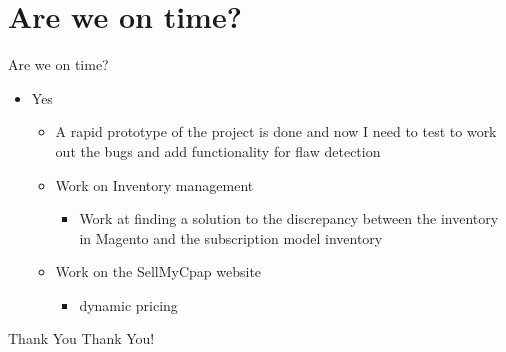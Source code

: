\documentclass[aspectratio=1610]{beamer}
\begin{document}
\section{Are we on time?}
\begin{frame}{Are we on time?}
    \begin{itemize}
        \item Yes
        \begin{itemize}
            \item A rapid prototype of the project is done and now I need to test to work out the bugs and add functionality for flaw detection
            \item Work on Inventory management 
            \begin{itemize}
                \item Work at finding a solution to the discrepancy between the inventory in Magento and the subscription model inventory
            \end{itemize}
            \item Work on the SellMyCpap website
            \begin{itemize}
                \item dynamic pricing
            \end{itemize}
        \end{itemize}
    \end{itemize}





\end{frame}

\begin{frame}{Thank You}
    \centering
    \Huge Thank You!
\end{frame}
\end{document}
